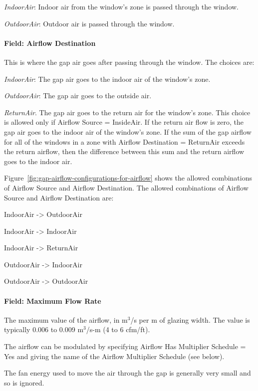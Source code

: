 \emph{IndoorAir}: Indoor air from the window's zone is passed through the window.

\emph{OutdoorAir}: Outdoor air is passed through the window.

\paragraph{Field: Airflow Destination}\label{field-airflow-destination}

This is where the gap air goes after passing through the window. The choices are:

\emph{IndoorAir}: The gap air goes to the indoor air of the window's zone.

\emph{OutdoorAir}: The gap air goes to the outside air.

\emph{ReturnAir}. The gap air goes to the return air for the window's zone. This choice is allowed only if Airflow Source = InsideAir. If the return air flow is zero, the gap air goes to the indoor air of the window's zone. If the sum of the gap airflow for all of the windows in a zone with Airflow Destination = ReturnAir exceeds the return airflow, then the difference between this sum and the return airflow goes to the indoor air.

Figure~\ref{fig:gap-airflow-configurations-for-airflow} shows the allowed combinations of Airflow Source and Airflow Destination. The allowed combinations of Airflow Source and Airflow Destination are:

IndoorAir -\textgreater{} OutdoorAir

IndoorAir -\textgreater{} IndoorAir

IndoorAir -\textgreater{} ReturnAir

OutdoorAir -\textgreater{} IndoorAir

OutdoorAir -\textgreater{} OutdoorAir

\paragraph{Field: Maximum Flow Rate}\label{field-maximum-flow-rate-003}

The maximum value of the airflow, in m\(^{3}\)/s per m of glazing width. The value is typically 0.006 to 0.009 m\(^{3}\)/s-m (4 to 6 cfm/ft).

The airflow can be modulated by specifying Airflow Has Multiplier Schedule = Yes and giving the name of the Airflow Multiplier Schedule (see below).

The fan energy used to move the air through the gap is generally very small and so is ignored.

